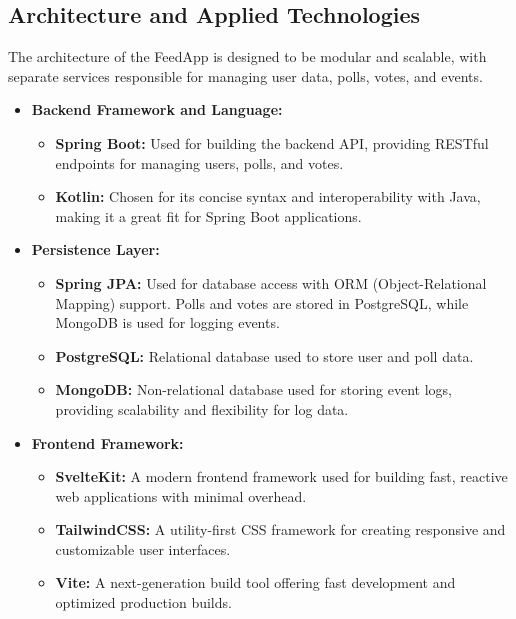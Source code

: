 \subsection{Architecture and Applied Technologies}
The architecture of the FeedApp is designed to be modular and scalable, with separate services responsible for managing user data, polls, votes, and events.
\begin{itemize}
    \item \textbf{Backend Framework and Language:} 
    \begin{itemize}
        \item \textbf{Spring Boot:} Used for building the backend API, providing RESTful endpoints for managing users, polls, and votes. \cite{spring_boot}
        \item \textbf{Kotlin:} Chosen for its concise syntax and interoperability with Java, making it a great fit for Spring Boot applications.\cite{kotlin}
    \end{itemize}
    
    \item \textbf{Persistence Layer:} 
    \begin{itemize}
        \item \textbf{Spring JPA:} Used for database access with ORM (Object-Relational Mapping) support. Polls and votes are stored in PostgreSQL, while MongoDB is used for logging events. \cite{spring_jpa}
        \item \textbf{PostgreSQL:} Relational database used to store user and poll data. \cite{postgresql}
        \item \textbf{MongoDB:} Non-relational database used for storing event logs, providing scalability and flexibility for log data. \cite{mongodb}
    \end{itemize}
    
    \item \textbf{Frontend Framework:} 
    \begin{itemize}
        \item \textbf{SvelteKit:} A modern frontend framework used for building fast, reactive web applications with minimal overhead. \cite{sveltekit}
        \item \textbf{TailwindCSS:} A utility-first CSS framework for creating responsive and customizable user interfaces. \cite{tailwindcss}
        \item \textbf{Vite:} A next-generation build tool offering fast development and optimized production builds. \cite{vite}
    \end{itemize}
    

\end{itemize}
